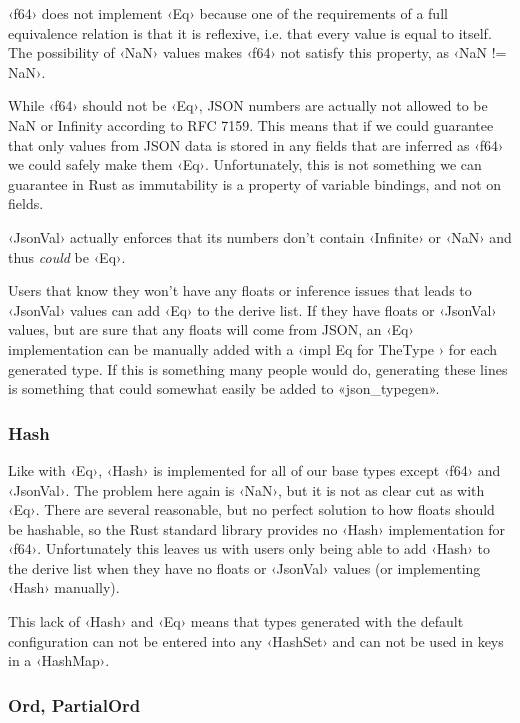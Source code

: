 ‹f64› does not implement ‹Eq› because one of the requirements of a full equivalence relation is that it is reflexive, i.e. that every value is equal to itself. The possibility of ‹NaN› values makes ‹f64› not satisfy this property, as ‹NaN != NaN›.

While ‹f64› should not be ‹Eq›, JSON numbers are actually not allowed to be NaN or Infinity according to RFC 7159\cite[7]{RFC7159}. This means that if we could guarantee that only values from JSON data is stored in any fields that are inferred as ‹f64› we could safely make them ‹Eq›. Unfortunately, this is not something we can guarantee in Rust as immutability is a property of variable bindings, and not on fields.

‹JsonVal› actually enforces that its numbers don't contain ‹Infinite› or ‹NaN› and thus \emph{could} be ‹Eq›.

Users that know they won't have any floats or inference issues that leads to ‹JsonVal› values can add ‹Eq› to the derive list. If they have floats or ‹JsonVal› values, but are sure that any floats will come from JSON, an ‹Eq› implementation can be manually added with a ‹impl Eq for TheType {}› for each generated type. If this is something many people would do, generating these lines is something that could somewhat easily be added to «json_typegen».

\subsubsection{Hash}

Like with ‹Eq›, ‹Hash› is implemented for all of our base types except ‹f64› and ‹JsonVal›. The problem here again is ‹NaN›, but it is not as clear cut as with ‹Eq›. There are several reasonable, but no perfect solution to how floats should be hashable, so the Rust standard library provides no ‹Hash› implementation for ‹f64›. Unfortunately this leaves us with users only being able to add ‹Hash› to the derive list when they have no floats or ‹JsonVal› values (or implementing ‹Hash› manually).

This lack of ‹Hash› and ‹Eq› means that types generated with the default configuration can not be entered into any ‹HashSet› and can not be used in keys in a ‹HashMap›.

\subsubsection{Ord, PartialOrd}


